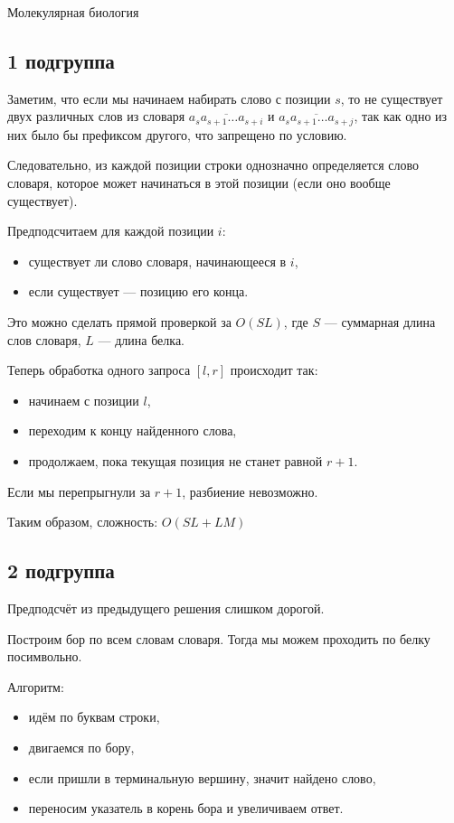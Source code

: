 \begin{tutorial}{Молекулярная биология}

\subsection*{1 подгруппа}

Заметим, что если мы начинаем набирать слово с позиции $s$, то не существует двух различных слов из словаря
$\overline{a_s a_{s+1} \ldots a_{s+i}}$
и
$\overline{a_s a_{s+1} \ldots a_{s+j}}$,
так как одно из них было бы префиксом другого, что запрещено по условию.

Следовательно, из каждой позиции строки однозначно определяется слово словаря, которое может начинаться в этой позиции (если оно вообще существует).

Предподсчитаем для каждой позиции $i$:
\begin{itemize}
    \item существует ли слово словаря, начинающееся в $i$,
    \item если существует --- позицию его конца.
\end{itemize}

Это можно сделать прямой проверкой за $O(SL)$, где $S$ --- суммарная длина слов словаря, $L$ --- длина белка.

Теперь обработка одного запроса $[l, r]$ происходит так:
\begin{itemize}
    \item начинаем с позиции $l$,
    \item переходим к концу найденного слова,
    \item продолжаем, пока текущая позиция не станет равной $r+1$.
\end{itemize}

Если мы перепрыгнули за $r+1$, разбиение невозможно.

Таким образом, сложность: $O(SL + LM)$

\subsection*{2 подгруппа}

Предподсчёт из предыдущего решения слишком дорогой.

Построим бор по всем словам словаря. Тогда мы можем проходить по белку посимвольно.

Алгоритм:
\begin{itemize}
    \item идём по буквам строки,
    \item двигаемся по бору,
    \item если пришли в терминальную вершину, значит найдено слово,
    \item переносим указатель в корень бора и увеличиваем ответ.
\end{itemize}


\end{tutorial}
